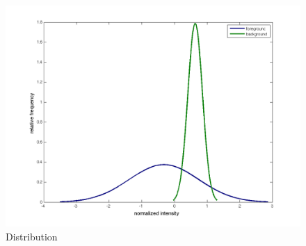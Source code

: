 \documentclass[a4paper,12pt]{article}
\begin{document}
\begin{figure}[htp]
\centering
\includegraphics[width=\linewidth]{pics/distribution.png}
\caption{Distribution} 
\label{fig:distribution}
\end{figure}
\end{document}
